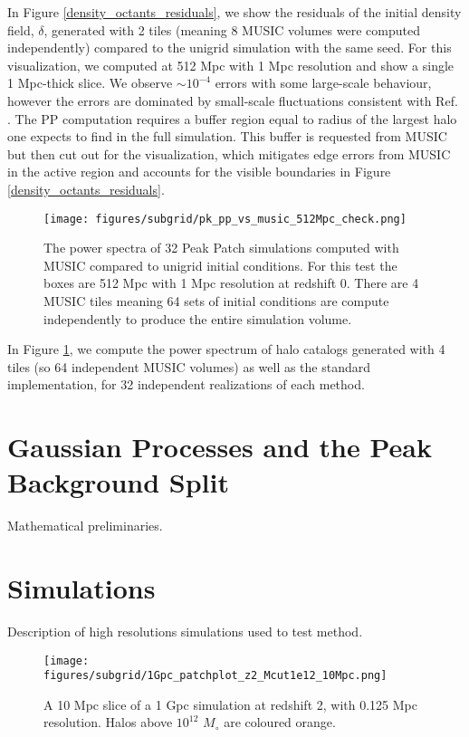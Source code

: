 In Figure \ref{density_octants_residuals}, we show the residuals of the initial density field, $\delta$, generated with 2 tiles (meaning 8 MUSIC volumes were computed independently) compared to the unigrid simulation with the same seed. For this visualization, we computed at 512 Mpc with 1 Mpc resolution and show a single 1 Mpc-thick slice. We observe $\sim 10^{-4}$ errors with some large-scale behaviour, however the errors are dominated by small-scale fluctuations consistent with Ref. \cite{music}. The PP computation requires a buffer region equal to radius of the largest halo one expects to find in the full simulation. This buffer is requested from MUSIC but then cut out for the visualization, which mitigates edge errors from MUSIC in the active region and accounts for the visible boundaries in Figure \ref{density_octants_residuals}.

\begin{figure}[h!] %
\begin{center}
\texttt{[image: figures/subgrid/pk\_pp\_vs\_music\_512Mpc\_check.png]}%
\caption{The power spectra of 32 Peak Patch simulations computed with MUSIC compared to unigrid initial conditions. For this test the boxes are 512 Mpc with 1 Mpc resolution at redshift 0. There are 4 MUSIC tiles meaning 64 sets of initial conditions are compute independently to produce the entire simulation volume.}
\label{pkcheck}
\end{center}
\end{figure}

In Figure \ref{pkcheck}, we compute the power spectrum of halo catalogs generated with 4 tiles (so 64 independent MUSIC volumes) as well as the standard implementation, for 32 independent realizations of each method.

\section{Gaussian Processes and the Peak Background Split}
\label{ch:signal:sec:gppbs}

Mathematical preliminaries.

\section{Simulations}
\label{ch:signal:sec:sims}

Description of high resolutions simulations used to test method.

\begin{figure}[h!] %
\begin{center}
\texttt{[image: figures/subgrid/1Gpc\_patchplot\_z2\_Mcut1e12\_10Mpc.png]}%
\caption{A 10 Mpc slice of a 1 Gpc simulation at redshift 2, with 0.125 Mpc resolution. Halos above $10^{12}$ $M_\circ$ are coloured orange.}
\label{musicslice}
\end{center}
\end{figure}

